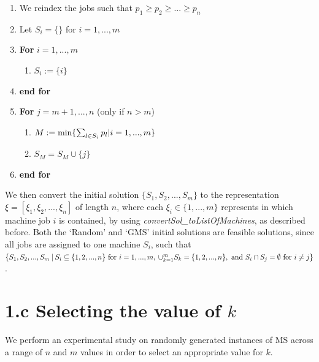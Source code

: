 \documentclass[12pt,a4paper,reqno]{article}
\begin{document}
\begin{enumerate}
\item We reindex the jobs such that $p_1 \geq p_2 \geq ... \geq p_n$
\item Let $S_i = \{ \}$ for $i=1,...,m$
\item \textbf{For} $i=1,...,m$
\begin{enumerate}
\item $S_i := \{i \}$
\end{enumerate}
\item[] \textbf{end for}
\item \textbf{For} $j=m+1,...,n$ (only if $n > m$)
\begin{enumerate}
\item $M := \textnormal{min} \{ \sum_{l \in S_i} p_l | i = 1,...,m \}$
\item $S_M = S_M \cup \{ j \}$
\end{enumerate}
\item[] \textbf{end for}
\end{enumerate}

We then convert the initial solution $\{S_1,S_2,...,S_m\}$ to the representation $\xi = [\xi_1,\xi_2,...,\xi_n]$ of length $n$, where each $\xi_i \in \{1,...,m\}$ represents in which machine job $i$ is contained, by using \textit{convertSol\_toListOfMachines}, as described before. Both the `Random' and `GMS' initial solutions are feasible solutions, since all jobs are assigned to one machine $S_i$, such that $\{S_1,S_2,...,S_m \> | \> S_i \subseteq \{1,2,...,n\} \textnormal{ for } i=1,...,m, \> \cup_{k=1}^m S_k = \{1,2,...,n\}, \textnormal{ and } S_i \cap S_j = \emptyset \textnormal{ for } i \neq j \}$. \\

\section*{1.c Selecting the value of $k$}
We perform an experimental study on randomly generated instances of MS across a range of $n$ and $m$ values in order to select an appropriate value for $k$. \\
\end{document}
